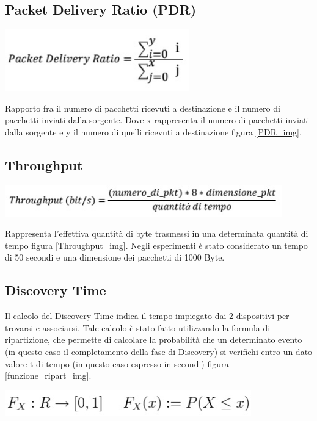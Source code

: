 \subsection{Packet Delivery Ratio (PDR)}
\begin{center}
\includegraphics[width=0.6\textwidth]{imgs/PDR.jpg}
\label{PDR_img}%
\end{center}

Rapporto fra il numero di pacchetti ricevuti a destinazione e il numero di pacchetti inviati dalla sorgente.
Dove x rappresenta il numero di pacchetti inviati dalla sorgente e y il numero di quelli ricevuti a destinazione figura \ref{PDR_img}. 

\subsection{Throughput}
\begin{center}
\includegraphics[width=0.9\textwidth]{imgs/Throughput.jpg}
\label{Throughput_img}%
\end{center}

Rappresenta l’effettiva quantità di byte trasmessi in una determinata quantità di tempo figura \ref{Throughput_img}.
Negli esperimenti è stato considerato un tempo di 50 secondi e una dimensione dei pacchetti di 1000 Byte.

\subsection{Discovery Time}

Il calcolo del Discovery Time indica il tempo impiegato dai 2 dispositivi per trovarsi e associarsi.
Tale calcolo è stato fatto utilizzando la formula di ripartizione, che permette di calcolare la probabilità che un determinato evento (in questo caso il completamento della fase di Discovery) si verifichi entro un dato valore t di tempo (in questo caso espresso in secondi) figura \ref{funzione_ripart_img}.

\begin{center}
\includegraphics[width=0.8\textwidth]{imgs/funzione_ripart.jpg}
\label{funzione_ripart_img}%
\end{center}




\clearpage{\pagestyle{empty}\cleardoublepage}